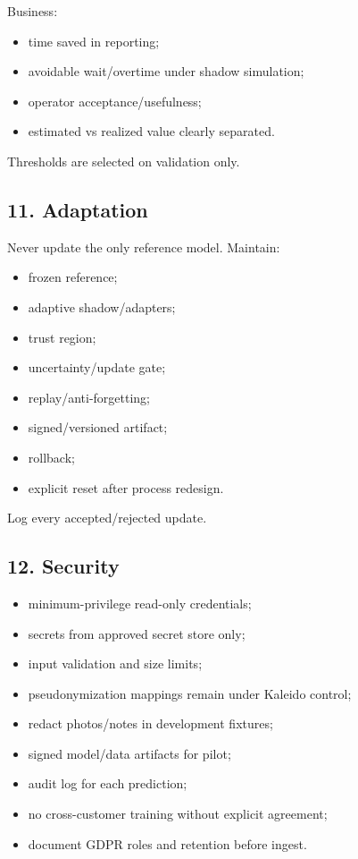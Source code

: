 \documentclass[
  spanish,
  10pt,
  a4paper,
]{article}
\providecommand{\tightlist}{%
  \setlength{\itemsep}{0pt}\setlength{\parskip}{0pt}}
\begin{document}
Business:

\begin{itemize}
\tightlist
\item
  time saved in reporting;
\item
  avoidable wait/overtime under shadow simulation;
\item
  operator acceptance/usefulness;
\item
  estimated vs realized value clearly separated.
\end{itemize}

Thresholds are selected on validation only.

\subsection{11. Adaptation}\label{11-adaptation}

Never update the only reference model. Maintain:

\begin{itemize}
\tightlist
\item
  frozen reference;
\item
  adaptive shadow/adapters;
\item
  trust region;
\item
  uncertainty/update gate;
\item
  replay/anti-forgetting;
\item
  signed/versioned artifact;
\item
  rollback;
\item
  explicit reset after process redesign.
\end{itemize}

Log every accepted/rejected update.

\subsection{12. Security}\label{12-security}

\begin{itemize}
\tightlist
\item
  minimum-privilege read-only credentials;
\item
  secrets from approved secret store only;
\item
  input validation and size limits;
\item
  pseudonymization mappings remain under Kaleido control;
\item
  redact photos/notes in development fixtures;
\item
  signed model/data artifacts for pilot;
\item
  audit log for each prediction;
\item
  no cross-customer training without explicit agreement;
\item
  document GDPR roles and retention before ingest.
\end{itemize}
\end{document}
